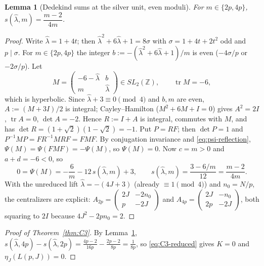 \documentclass[11pt]{article}
\newtheorem{lemma}[theorem]{Lemma}
\theoremstyle{definition}
\newcommand{\Z}{\mathbb Z}
\begin{document}
\begin{lemma}[Dedekind sums at the silver unit, even moduli]
\label{lem:R}
For $m\in\{2p,4p\}$, $s(\hat\lambda,m)=\dfrac{m-2}{4m}$.
\end{lemma}

\begin{proof}
Write $\hat\lambda=1+4t$; then $\hat\lambda^2+6\hat\lambda+1=8\sigma$
with $\sigma=1+4t+2t^2$ odd and $p\mid\sigma$.  For $m\in\{2p,4p\}$ the
integer $b:=-(\hat\lambda^2+6\hat\lambda+1)/m$ is even ($-4\sigma/p$ or
$-2\sigma/p$).  Let
\[
 M=\begin{pmatrix}-6-\hat\lambda&b\\ m&\hat\lambda\end{pmatrix}\in SL_2(\Z),
 \qquad\operatorname{tr}M=-6,
\]
which is hyperbolic.  Since $\hat\lambda+3\equiv0\pmod4$ and $b,m$ are
even, $A:=(M+3I)/2$ is integral; Cayley--Hamilton ($M^2+6M+I=0$) gives
$A^2=2I$, $\operatorname{tr}A=0$, $\det A=-2$.  Hence $R:=I+A$ is
integral, commutes with $M$, and has $\det R=(1+\sqrt2)(1-\sqrt2)=-1$.
Put $P=RF$; then $\det P=1$ and $P^{-1}MP=FR^{-1}MRF=FMF$.  By
conjugation invariance and \eqref{eq:psi-reflection},
$\Psi(M)=\Psi(FMF)=-\Psi(M)$, so $\Psi(M)=0$.  Now $c=m>0$ and
$a+d=-6<0$, so
\[
 0=\Psi(M)=-\frac6m-12\,s(\hat\lambda,m)+3,\qquad
 s(\hat\lambda,m)=\frac{3-6/m}{12}=\frac{m-2}{4m}.
\]
With the unreduced lift $\hat\lambda=-(4J+3)$ (already $\equiv1\pmod4$)
and $n_0=N/p$, the centralizers are explicit:
$A_{2p}=\begin{pmatrix}2J&-2n_0\\p&-2J\end{pmatrix}$ and
$A_{4p}=\begin{pmatrix}2J&-n_0\\2p&-2J\end{pmatrix}$, both squaring to
$2I$ because $4J^2-2pn_0=2$.
\end{proof}

\begin{proof}[Proof of Theorem~\ref{thm:C3}]
By Lemma~\ref{lem:R},
$s(\hat\lambda,4p)-s(\hat\lambda,2p)=\frac{4p-2}{16p}-\frac{2p-2}{8p}=\frac1{8p}$,
so \eqref{eq:C3-reduced} gives $K=0$ and $\eta_J(L(p,J))=0$.
\end{proof}
\end{document}
